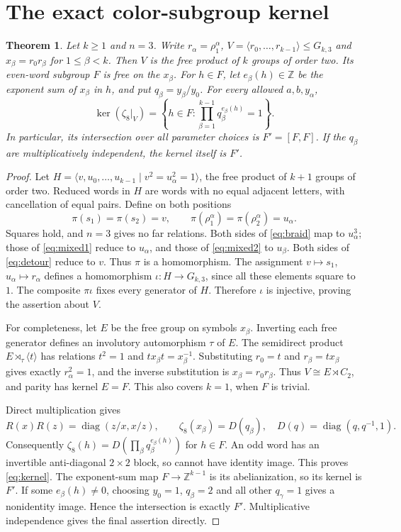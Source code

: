 \documentclass[11pt]{article}
\newtheorem{theorem}{Theorem}
\begin{document}
\section{The exact color-subgroup kernel}
\begin{theorem}\label{thm:kernel}
Let $k\ge1$ and $n=3$. Write $r_\alpha=\rho_1^\alpha$,
$V=\langle r_0,\ldots,r_{k-1}\rangle\le G_{k,3}$ and
$x_\beta=r_0r_\beta$ for $1\le\beta<k$.
Then $V$ is the free product of $k$ groups of order two.
Its even-word subgroup $F$ is free on the $x_\beta$.
For $h\in F$, let $e_\beta(h)\in\mathbb Z$ be the exponent sum of
$x_\beta$ in $h$, and put $q_\beta=y_\beta/y_0$. For every allowed
$a,b,y_\alpha$,
\begin{equation}\label{eq:kernel}
 \ker(\zeta_8|_V)
 =\left\{h\in F:\prod_{\beta=1}^{k-1}q_\beta^{e_\beta(h)}=1\right\}.
\end{equation}
In particular, its intersection over all parameter choices is $F'=[F,F]$.
If the $q_\beta$ are multiplicatively independent, the kernel itself is $F'$.
\end{theorem}
\begin{proof}
Let $H=\langle v,u_0,\ldots,u_{k-1}\mid v^2=u_\alpha^2=1\rangle$,
the free product of $k+1$ groups of order two. Reduced words in $H$
are words with no equal adjacent letters, with cancellation of equal pairs.
Define on both positions
\[
 \pi(s_1)=\pi(s_2)=v,\qquad
 \pi(\rho_1^\alpha)=\pi(\rho_2^\alpha)=u_\alpha.
\]
Squares hold, and $n=3$ gives no far relations. Both sides of
\eqref{eq:braid} map to $u_\alpha^3$; those of
\eqref{eq:mixed1} reduce to $u_\alpha$, and those of
\eqref{eq:mixed2} to $u_\beta$. Both sides of
\eqref{eq:detour} reduce to $v$. Thus $\pi$ is a homomorphism.
The assignment $v\mapsto s_1$, $u_\alpha\mapsto r_\alpha$ defines
a homomorphism $\iota:H\to G_{k,3}$, since all these elements square
to $1$. The composite $\pi\iota$ fixes every generator of $H$.
Therefore $\iota$ is injective, proving the assertion about $V$.

For completeness, let $E$ be the free group on symbols $x_\beta$.
Inverting each free generator defines an involutory automorphism $\tau$
of $E$. The semidirect product $E\rtimes_\tau\langle t\rangle$ has
relations $t^2=1$ and $tx_\beta t=x_\beta^{-1}$.
Substituting $r_0=t$ and $r_\beta=tx_\beta$ gives exactly
$r_\alpha^2=1$, and the inverse substitution is $x_\beta=r_0r_\beta$.
Thus $V\cong E\rtimes C_2$, and parity has kernel $E=F$.
This also covers $k=1$, when $F$ is trivial.

Direct multiplication gives
\[
 R(x)R(z)=\operatorname{diag}(z/x,x/z),\qquad
 \zeta_8(x_\beta)=D(q_\beta),\quad D(q)=\operatorname{diag}(q,q^{-1},1).
\]
Consequently $\zeta_8(h)=D(\prod_\beta q_\beta^{e_\beta(h)})$ for
$h\in F$. An odd word has an invertible anti-diagonal $2\times2$
block, so cannot have identity image. This proves \eqref{eq:kernel}.
The exponent-sum map $F\to\mathbb Z^{k-1}$ is its abelianization,
so its kernel is $F'$. If some $e_\beta(h)\ne0$, choosing
$y_0=1$, $q_\beta=2$ and all other $q_\gamma=1$ gives a nonidentity
image. Hence the intersection is exactly $F'$. Multiplicative
independence gives the final assertion directly.
\end{proof}
\end{document}
